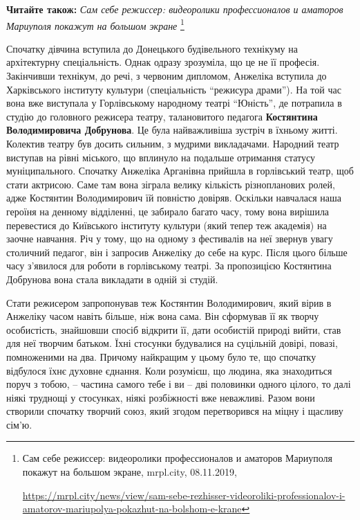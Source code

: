 \textbf{Читайте також:} \emph{Сам себе режиссер: видеоролики профессионалов и аматоров Мариуполя покажут на большом экране}%
\footnote{Сам себе режиссер: видеоролики профессионалов и аматоров Мариуполя покажут на большом экране, mrpl.city, 08.11.2019, \par%
\url{https://mrpl.city/news/view/sam-sebe-rezhisser-videoroliki-professionalov-i-amatorov-mariupolya-pokazhut-na-bolshom-e-krane}
}

Спочатку дівчина вступила до Донецького будівельного технікуму на архітектурну
спеціальність. Однак одразу зрозуміла, що це не її професія. Закінчивши
технікум, до речі, з червоним дипломом, Анжеліка вступила до Харківського
інституту культури (спеціальність \enquote{режисура драми}). На той час вона вже
виступала у Горлівському народному театрі \enquote{Юність}, де потрапила в студію до
головного режисера театру, талановитого педагога \textbf{Костянтина Володимировича
Добрунова}. Це була найважливіша зустріч в їхньому житті. Колектив театру був
досить сильним, з мудрими викладачами. Народний театр виступав на рівні
міського, що вплинуло на подальше отримання статусу муніципального. Спочатку
Анжеліка Арганівна прийшла в горлівський театр, щоб стати актрисою. Саме там
вона зіграла велику кількість різнопланових ролей, адже Костянтин Володимирович
їй повністю довіряв. Оскільки навчалася наша героїня на денному відділенні, це
забирало багато часу, тому вона вирішила перевестися до Київського інституту
культури (який тепер теж академія) на заочне навчання. Річ у тому, що на одному
з фестивалів на неї звернув увагу столичний педагог, він і запросив Анжеліку до
себе на курс. Після цього більше часу з'явилося для роботи в горлівському
театрі. За пропозицією Костянтина Добрунова вона стала викладати в одній зі
студій.


Стати режисером запропонував теж Костянтин Володимирович, який вірив в Анжеліку
часом навіть більше, ніж вона сама. Він сформував її як творчу особистість,
знайшовши спосіб відкрити її, дати особистій природі вийти, став для неї
творчим батьком. Їхні стосунки будувалися на суцільній довірі, повазі,
помноженими на два. Причому найкращим у цьому було те, що спочатку відбулося
їхнє духовне єднання. Коли розумієш, що людина, яка знаходиться поруч з тобою,
– частина самого тебе і ви – дві половинки одного цілого, то далі ніякі
труднощі у стосунках, ніякі розбіжності вже неважливі. Разом вони створили
спочатку творчий союз, який згодом перетворився на міцну і щасливу сім'ю.

